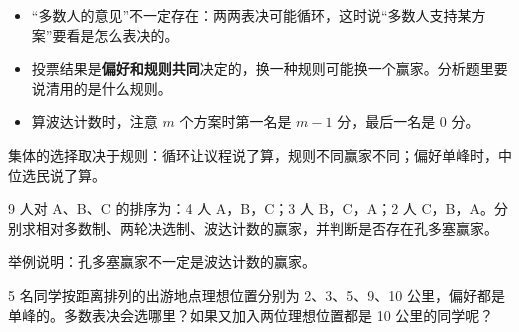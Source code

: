 \begin{pitfall}
\begin{itemize}
  \item “多数人的意见”不一定存在：两两表决可能循环，这时说“多数人支持某方案”要看是怎么表决的。
  \item 投票结果是\textbf{偏好和规则共同}决定的，换一种规则可能换一个赢家。分析题里要说清用的是什么规则。
  \item 算波达计数时，注意 $m$ 个方案时第一名是 $m-1$ 分，最后一名是 0 分。
\end{itemize}
\end{pitfall}

\begin{oneline}
集体的选择取决于规则：循环让议程说了算，规则不同赢家不同；偏好单峰时，中位选民说了算。
\end{oneline}

\begin{exercises}[练一练]
  \item 9 人对 A、B、C 的排序为：4 人 A，B，C；3 人 B，C，A；2 人 C，B，A。分别求相对多数制、两轮决选制、波达计数的赢家，并判断是否存在孔多塞赢家。
  \item 举例说明：孔多塞赢家不一定是波达计数的赢家。
  \item 5 名同学按距离排列的出游地点理想位置分别为 2、3、5、9、10 公里，偏好都是单峰的。多数表决会选哪里？如果又加入两位理想位置都是 10 公里的同学呢？
\end{exercises}
